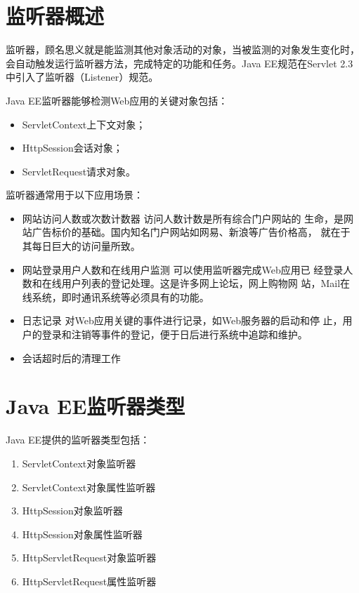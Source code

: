 \section{监听器概述}

监听器，顾名思义就是能监测其他对象活动的对象，当被监测的对象发生变化时，
会自动触发运行监听器方法，完成特定的功能和任务。Java EE规范在Servlet
2.3中引入了监听器（Listener）规范。

Java EE监听器能够检测Web应用的关键对象包括：

\begin{itemize}
\item ServletContext上下文对象；
\item HttpSession会话对象；
\item ServletRequest请求对象。
\end{itemize}

监听器通常用于以下应用场景：

\begin{itemize}
\item {\hei 网站访问人数或次数计数器} 访问人数计数是所有综合门户网站的
  生命，是网站广告标价的基础。国内知名门户网站如网易、新浪等广告价格高，
  就在于其每日巨大的访问量所致。
\item {\hei 网站登录用户人数和在线用户监测} 可以使用监听器完成Web应用已
  经登录人数和在线用户列表的登记处理。这是许多网上论坛，网上购物网
  站，Mail在线系统，即时通讯系统等必须具有的功能。
\item {\hei 日志记录} 对Web应用关键的事件进行记录，如Web服务器的启动和停
  止，用户的登录和注销等事件的登记，便于日后进行系统中追踪和维护。
\item {\hei 会话超时后的清理工作}
\end{itemize}


\section{Java EE监听器类型}

Java EE提供的监听器类型包括：

\begin{enumerate}
\item ServletContext对象监听器
\item ServletContext对象属性监听器
\item HttpSession对象监听器
\item HttpSession对象属性监听器
\item HttpServletRequest对象监听器
\item HttpServletRequest属性监听器
\end{enumerate}

